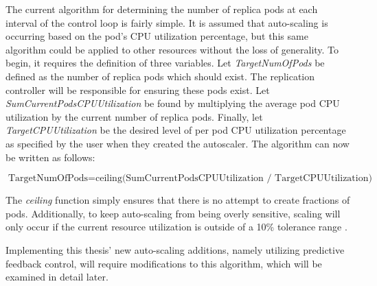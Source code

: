 The current algorithm for determining the number of replica pods at each interval
of the control loop is fairly simple. It is assumed that auto-scaling is
occurring based on the pod's CPU utilization percentage, but this same algorithm
could be applied to other resources without the loss of generality.
To begin, it requires the definition of
three variables. Let \textit{TargetNumOfPods} be defined as the number of
replica pods which should exist. The replication controller will be responsible
for ensuring these pods exist. Let \textit{SumCurrentPodsCPUUtilization} be
found by multiplying the average pod CPU utilization by the current number of
replica pods. Finally, let \textit{TargetCPUUtilization} be the desired level of
per pod CPU utilization percentage as specified by the user when they created
the autoscaler. The algorithm can now be written as follows:

\[ \mbox{TargetNumOfPods} = \mbox{ceiling(SumCurrentPodsCPUUtilization /
TargetCPUUtilization)} \]

The \textit{ceiling} function simply ensures that there is no attempt to create
fractions of pods. Additionally, to keep auto-scaling from being overly
sensitive, scaling will only occur if the current resource utilization is
outside of a 10\% tolerance range \cite{k8s-horizontal-pod-autoscaler-proposal}.

Implementing this thesis' new auto-scaling additions, namely utilizing
predictive feedback control, will require modifications to this algorithm, which
will be examined in detail later.

